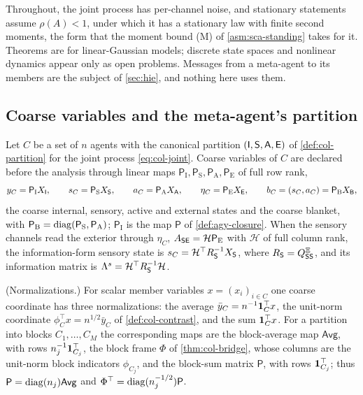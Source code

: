 Throughout, the joint process has per-channel noise, and stationary statements assume $\rho(A)<1$, under which it has a stationary law with finite second moments, the form that the moment bound (M) of \cref{asm:sca-standing} takes for it. Theorems are for linear-Gaussian models; discrete state spaces and nonlinear dynamics appear only as open problems. Messages from a meta-agent to its members are the subject of \cref{sec:hie}, and nothing here uses them.

\subsection{Coarse variables and the meta-agent's partition}\label{sec:met-coarse}

\begin{definition}\label{def:met-coarse}
Let $C$ be a set of $n$ agents with the canonical partition $(\mathsf{I},\mathsf{S},\mathsf{A},\mathsf{E})$ of \cref{def:col-partition} for the joint process \eqref{eq:col-joint}. Coarse variables of $C$ are declared before the analysis through linear maps $\mathsf P_{\mathrm I},\mathsf P_{\mathrm S},\mathsf P_{\mathrm A},\mathsf P_{\mathrm E}$ of full row rank,
\begin{equation}\label{eq:met-coarse}
y_C=\mathsf P_{\mathrm I}X_{\mathsf{I}},\qquad s_C=\mathsf P_{\mathrm S}X_{\mathsf{S}},\qquad a_C=\mathsf P_{\mathrm A}X_{\mathsf{A}},\qquad\eta_C=\mathsf P_{\mathrm E}X_{\mathsf{E}},\qquad b_C=(s_C,a_C)=\mathsf P_{\mathrm B}X_{\mathsf{B}},
\end{equation}
the coarse internal, sensory, active and external states and the coarse blanket, with $\mathsf P_{\mathrm B}=\operatorname{diag}(\mathsf P_{\mathrm S},\mathsf P_{\mathrm A})$; $\mathsf P_{\mathrm I}$ is the map $\mathsf P$ of \cref{def:agy-closure}. When the sensory channels read the exterior through $\eta_C$, $A_{\mathsf{S}\mathsf{E}}=\mathcal H\mathsf P_{\mathrm E}$ with $\mathcal H$ of full column rank, the information-form sensory state is $s_C=\mathcal H^\top R_{\mathsf{S}}^{-1}X_{\mathsf{S}}$, where $R_{\mathsf{S}}=Q^{\Xi}_{\mathsf{S}\mathsf{S}}$, and its information matrix is $\Lambda^s=\mathcal H^\top R_{\mathsf{S}}^{-1}\mathcal H$.

(Normalizations.) For scalar member variables $x=(x_i)_{i\in C}$ one coarse coordinate has three normalizations: the average $\bar y_C=n^{-1}\mathbf{1}_C^\top x$, the unit-norm coordinate $\phi_C^\top x=n^{1/2}\bar y_C$ of \cref{def:col-contrast}, and the sum $\mathbf{1}_C^\top x$. For a partition into blocks $C_1,\dots,C_M$ the corresponding maps are the block-average map $\mathsf{Avg}$, with rows $n_j^{-1}\mathbf{1}_{C_j}^\top$, the block frame $\Phi$ of \cref{thm:col-bridge}, whose columns are the unit-norm block indicators $\phi_{C_j}$, and the block-sum matrix $\mathsf P$, with rows $\mathbf{1}_{C_j}^\top$; thus $\mathsf P=\operatorname{diag}(n_j)\mathsf{Avg}$ and $\Phi^\top=\operatorname{diag}(n_j^{-1/2})\mathsf P$.
\end{definition}

